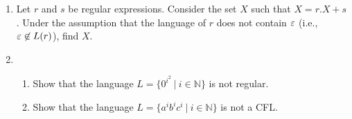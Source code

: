 \begin{exercise}{0}
  \begin{enumerate}
    \item Let $r$ and $s$ be regular expressions. Consider the set $X$ such that $X = r.X + s$. Under the assumption that the language of $r$ does not contain $\varepsilon$ (i.e., $\varepsilon \not\in L(r)$), find $X$.
    \item
      \begin{enumerate}
        \item Show that the language $L=\{0^{i^2} \ |\ i\in \mathbb{N}\}$ is not regular.
        \item Show that the language $L=\{a^ib^ic^i \ |\ i\in \mathbb{N}\}$ is not a CFL.
      \end{enumerate}
  \end{enumerate}
\end{exercise}

